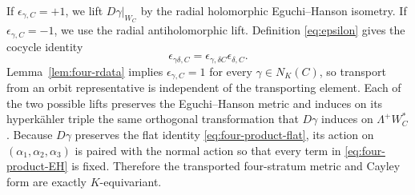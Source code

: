 \documentclass[11pt]{article}
\theoremstyle{remark}\newtheorem{remark}[theorem]{Remark}
\begin{document}
If $\epsilon_{\gamma,C}=+1$, we lift $D\gamma|_{W_C}$ by the radial
holomorphic Eguchi--Hanson isometry.  If $\epsilon_{\gamma,C}=-1$, we use
the radial antiholomorphic lift.  Definition \eqref{eq:epsilon} gives the
cocycle identity
\begin{equation}\label{eq:epsilon-cocycle}
\epsilon_{\gamma\delta,C}=\epsilon_{\gamma,\delta C}\epsilon_{\delta,C}.
\end{equation}
Lemma~\ref{lem:four-rdata} implies $\epsilon_{\gamma,C}=1$ for every
$\gamma\in N_K(C)$, so transport from an orbit representative is
independent of the transporting element.  Each of the two possible lifts
preserves the Eguchi--Hanson metric and induces on its hyperk\"ahler triple
the same orthogonal transformation that $D\gamma$ induces on
$\Lambda^+W_C^*$.  Because $D\gamma$ preserves the flat identity
\eqref{eq:four-product-flat}, its action on
$(\alpha_1,\alpha_2,\alpha_3)$ is paired with the normal action so that
every term in \eqref{eq:four-product-EH} is fixed.  Therefore the
transported four-stratum metric and Cayley form are exactly
$K$-equivariant.
\end{document}
